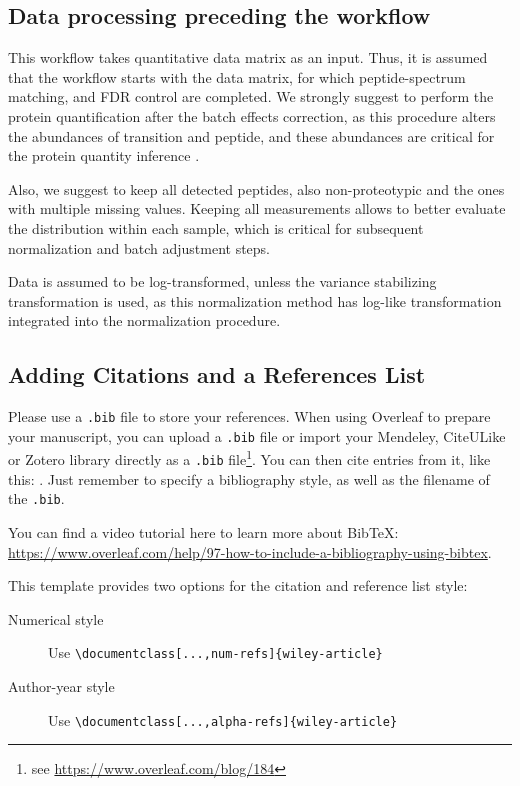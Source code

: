 \documentclass[num-refs]{wiley-article}
\begin{document}
\subsection{Data processing preceding the workflow} 
This workflow takes quantitative data matrix as an input. Thus, it is assumed that the workflow starts with the data matrix, for which peptide-spectrum matching, and FDR control are completed. We strongly suggest to perform the protein quantification after the batch effects correction, as this procedure alters the abundances of transition and peptide, and these abundances are critical for the protein quantity inference \cite{Clough:2012aa, Teo:2015aa}.  

Also, we suggest to keep all detected peptides, also non-proteotypic and the ones with multiple missing values. Keeping all measurements allows to better evaluate the distribution within each sample, which is critical for subsequent normalization and batch adjustment steps.

Data is assumed to be log-transformed, unless the variance stabilizing transformation \cite{Durbin2002} is used, as this normalization method has log-like transformation integrated into the normalization procedure.

\subsection{Adding Citations and a References List}

Please use a \verb|.bib| file to store your references. When using Overleaf to prepare your manuscript, you can upload a \verb|.bib| file or import your Mendeley, CiteULike or Zotero library directly as a \verb|.bib| file\footnote{see \url{https://www.overleaf.com/blog/184}}. You can then cite entries from it, like this: \cite{Gregori2012}. Just remember to specify a bibliography style, as well as the filename of the \verb|.bib|.

You can find a video tutorial here to learn more about BibTeX: \url{https://www.overleaf.com/help/97-how-to-include-a-bibliography-using-bibtex}.

This template provides two options for the citation and reference list style: 
\begin{description}
\item[Numerical style] Use \verb|\documentclass[...,num-refs]{wiley-article}|
\item[Author-year style] Use \verb|\documentclass[...,alpha-refs]{wiley-article}|
\end{description}
\end{document}
